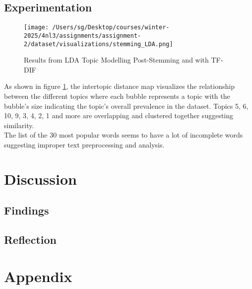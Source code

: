 \documentclass[titlepage]{article}
\begin{document}
\subsection{Experimentation}
\begin{figure}[H]\label{fig:stemming}
    \centering
    \texttt{[image: /Users/sg/Desktop/courses/winter-2025/4nl3/assignments/assignment-2/dataset/visualizations/stemming\_LDA.png]}
    \caption{Results from LDA Topic Modelling Post-Stemming and with TF-DIF}
\end{figure}

As shown in figure \ref{fig:stemming}, the intertopic distance map visualizes the relationship between the different topics where each bubble represents 
a topic with the bubble's size indicating the topic's overall prevalence in the dataset. Topics 5, 6, 10, 9, 3, 4, 2, 1 and more are overlapping and 
clustered together suggesting similarity. \\

The list of the 30 most popular words seems to have a lot of incomplete words suggesting improper text preprocessing and analysis.

\section{Discussion}

\subsection{Findings}

\subsection{Reflection}

\section{Appendix}
\end{document}

